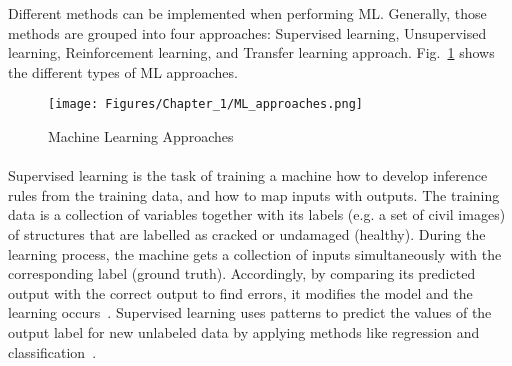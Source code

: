 Different methods can be implemented when performing ML. 
Generally, those methods are grouped into four approaches: Supervised learning, Unsupervised learning, Reinforcement learning, and Transfer learning approach.
Fig.~\ref{fig:Machine_learning_approaches} shows the different types of ML approaches.
\begin{figure} [!ht]
	\begin{center}
		\centering
		\texttt{[image: Figures/Chapter\_1/ML\_approaches.png]}
	\end{center}
	\caption{Machine Learning Approaches} 
	\label{fig:Machine_learning_approaches}
\end{figure}
\paragraph{}
Supervised learning is the task of training a machine how to develop inference rules from the training data, and how to map inputs with outputs.
The training data is a collection of variables together with its labels (e.g. a set of civil images) of structures that are labelled as cracked or undamaged (healthy).
During the learning process, the machine gets a collection of inputs simultaneously with the corresponding label (ground truth).
Accordingly, by comparing its predicted output with the correct output to find errors, it modifies the model and the learning occurs~\cite{Ongsulee2018}. 
Supervised learning uses patterns to predict the values of the output label for new unlabeled data by applying methods like regression and classification~\cite{Ongsulee2018}. 

